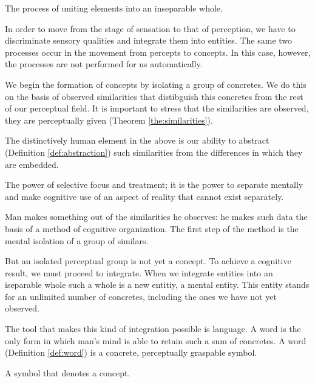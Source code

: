             \begin{definition}[Integration]
            \label{def:integration}
                The process of uniting elements into an inseparable whole.
            \end{definition}

        In order to move from the stage of sensation to that of perception, we have to discriminate sensory qualities and integrate them into entities. The same two processes occur in the movement from percepts to concepts. In this case, however, the processes are not performed for us automatically.

        We begin the formation of concepts by isolating a group of concretes. We do this on the basis of observed similarities that distibguish this concretes from the rest of our perceptual field. It is important to stress that the similarities are observed, they are perceptually given (Theorem \ref{the:similarities}).

        The distinctively human element in the above is our ability to abstract (Definition \ref{def:abstraction}) such similarities from the differences in which they are embedded.

            \begin{definition}[Abstraction]
            \label{def:abstraction}
                The power of selective focus and treatment; it is the power to separate mentally and make cognitive use of an aspect of reality that cannot exist separately.
            \end{definition}

        Man makes something out of the similarities he observes: he makes such data the basis of a method of cognitive organization. The first step of the method is the mental isolation of a group of similars.

        But an isolated perceptual group is not yet a concept. To achieve a cognitive result, we must proceed to integrate. When we integrate entities into an iseparable whole such a whole is a new entitiy, a mental entity. This entity stands for an unlimited number of concretes, including the ones we have not yet observed.

        The tool that makes this kind of integration possible is language. A word is the only form in which man's mind is able to retain such a sum of concretes. A word (Definition \ref{def:word}) is a concrete, perceptually graspable symbol.

            \begin{definition}[Word]
            \label{def:word}
                A symbol that denotes a concept.
            \end{definition}

